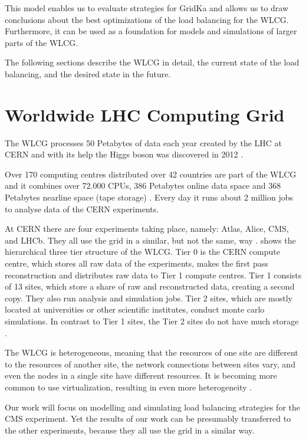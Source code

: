 This model enables us to evaluate strategies for GridKa and allows us to draw conclusions about the best optimizations of the load balancing for the WLCG. Furthermore, it can be used as a foundation for models and simulations of larger parts of the WLCG.


The following sections describe the WLCG in detail, the current state of the load balancing, and the desired state in the future.

\section{Worldwide LHC Computing Grid}

The WLCG processes 50 Petabytes of data each year created by the LHC at CERN \cite{data_process}
and with its help the Higgs boson was discovered in 2012 \cite{wlcg_online}.

Over 170 computing centres distributed over 42 countries are part of the WLCG and it combines over 72.000 CPUs, 386 Petabytes online data space and 368 Petabytes nearline space (tape storage) \cite{wlcg_data}. Every day it runs about 2 million jobs to analyse data of the CERN experiments.

At CERN there are four experiments taking place, namely: Atlas, Alice, CMS, and LHCb. They all use the grid in a similar, but not the same, way \cite{wlcg_computing}.  shows the hierarchical three tier structure of the WLCG. Tier 0 is the CERN compute centre, which stores all raw data of the experiments, makes the first pass reconstruction and distributes raw data to Tier 1 compute centres. Tier 1 consists of 13 sites, which store a share of raw and reconstructed data, creating a second copy. They also run analysis and simulation jobs. Tier 2 sites, which are mostly located at universities or other scientific institutes, conduct monte carlo simulations. In contrast to Tier 1 sites, the Tier 2 sites do not have much storage \cite{wlcg_computing}.

The WLCG is heterogeneous, meaning that the resources of one site are different to the resources of another site, the network connections between sites vary, and even the nodes in a single site have different resources. It is becoming more common to use virtualization, resulting in even more heterogeneity \cite{wlcg_update}.

Our work will focus on modelling and simulating load balancing strategies for the CMS experiment. Yet the results of our work can be presumably transferred to the other experiments, because they all use the grid in a similar way.

